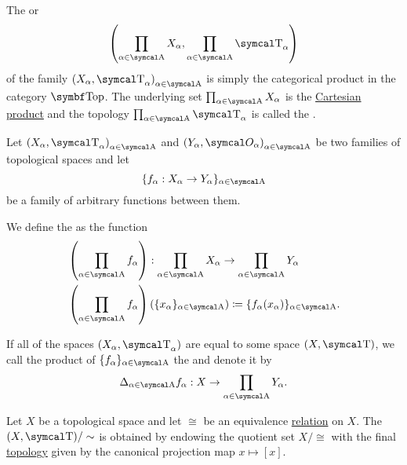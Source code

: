 \begin{definition}\label{def:topological_product}
  The  or  
  \begin{equation*}
    \left( \prod_{\al \in \CA} X_\al, \prod_{\al \in \CA} \CT_\al \right)
  \end{equation*}
  of the family \( { (X_\al, \CT_\al) }_{\al \in \CA} \) is simply the categorical product in the category \( \Cat{Top} \). The underlying set \( \prod_{\al \in \CA} X_\al \) is the \hyperref[def:cartesian_product]{Cartesian product} and the topology \( \prod_{\al \in \CA} \CT_\al \) is called the .

  Let \( { (X_\al, \CT_\al) }_{\al \in \CA} \) and \( { (Y_\al, \Cal{O}_\al) }_{\al \in \CA} \) be two families of topological spaces and let
  \begin{equation*}
    \{ f_\al: X_\al \to Y_\al \}_{\al \in \CA}
  \end{equation*}
  be a family of arbitrary functions between them.

  We define the  as the function
  \begin{align*}
    &\left(\prod_{\al \in \CA} f_\al \right): \prod_{\al \in \CA} X_\al \to \prod_{\al \in \CA} Y_\al \\
    &\left(\prod_{\al \in \CA} f_\al \right)(\{ x_\al \}_{\al \in \CA}) \coloneqq \{ f_\al (x_\al) \}_{\al \in \CA}.
  \end{align*}

  If all of the spaces \( (X_\al, \CT_\al) \) are equal to some space \( (X, \CT) \), we call the product of \( \{ f_\al \}_{\al \in \CA} \) the  and denote it by
  \begin{equation*}
    \Delta_{\al \in \CA} f_\al: X \to \prod_{\al \in \CA} Y_\al.
  \end{equation*}
\end{definition}

\begin{definition}\label{def:topological_quotient}\cite[90]{Engelking1989}
  Let \( X \) be a topological space and let \( \cong \) be an equivalence \hyperref[def:equivalence_relation]{relation} on \( X \). The  \( (X, \CT) / \sim \) is obtained by endowing the quotient set \( X / \cong \) with the final \hyperref[def:final_topology]{topology} given by the canonical projection map \( x \mapsto [x] \).
\end{definition}

